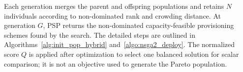 \documentclass[10pt, conference, letterpaper]{IEEEtran}
\newenvironment{revision}{\begingroup\color{blue}}{\endgroup}
\newenvironment{revision}{\begingroup}{\endgroup}
\begin{document}
\begin{revision}
Each generation merges the parent and offspring populations and retains $N$ individuals according to non-dominated rank and crowding distance. At generation $G$, PSP returns the non-dominated capacity-feasible provisioning schemes found by the search. The detailed steps are outlined in Algorithms~\ref{alg:init_pop_hybrid} and~\ref{algo:nsga2_deploy}.
\end{revision}
\begin{revision}
The normalized score $Q$ is applied after optimization to select one balanced solution for scalar comparison; it is not an objective used to generate the Pareto population.
\end{revision}



\end{document}
